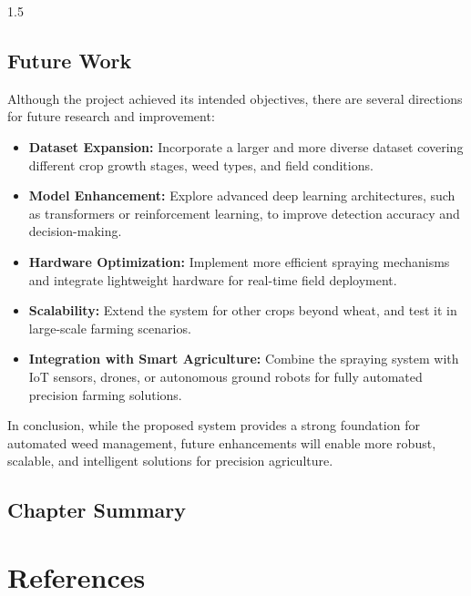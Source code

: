 \documentclass[A4paper,12pt]{report}
\theoremstyle{plain}
\theoremstyle{definition}
\theoremstyle{remark}
\numberwithin{equation}{section}
\begin{document}
\begin{spacing}{1.5}
\section{Future Work}
Although the project achieved its intended objectives, there are
several directions for future research and improvement:

\begin{itemize}
    \item \textbf{Dataset Expansion:} Incorporate a larger and more
    diverse dataset covering different crop growth stages, weed types,
    and field conditions.
    
    \item \textbf{Model Enhancement:} Explore advanced deep learning
    architectures, such as transformers or reinforcement learning,
    to improve detection accuracy and decision-making.
    
    \item \textbf{Hardware Optimization:} Implement more efficient
    spraying mechanisms and integrate lightweight hardware for
    real-time field deployment.
    
    \item \textbf{Scalability:} Extend the system for other crops
    beyond wheat, and test it in large-scale farming scenarios.
    
    \item \textbf{Integration with Smart Agriculture:} Combine the
    spraying system with IoT sensors, drones, or autonomous ground
    robots for fully automated precision farming solutions.
\end{itemize}

In conclusion, while the proposed system provides a strong foundation
for automated weed management, future enhancements will enable more
robust, scalable, and intelligent solutions for precision agriculture.
\section{Chapter Summary}

\end{spacing}
\chapter*{References}
\end{document}
